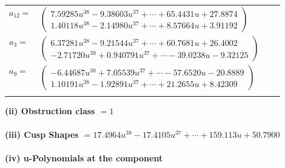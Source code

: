 \documentclass[1p]{elsarticle_modified}
\theoremstyle{definition}
\begin{document}
\begin{tabular}{m{7pt} m{180pt} m{7pt} m{180pt} }
\flushright $a_{12}=$&$\begin{pmatrix}7.59285 u^{38}-9.38603 u^{37}+\cdots+65.4431 u+27.8874\\1.40118 u^{38}-2.14980 u^{37}+\cdots+8.57664 u+3.91192\end{pmatrix}$ \\
\flushright $a_{3}=$&$\begin{pmatrix}6.37281 u^{38}-9.21544 u^{37}+\cdots+60.7681 u+26.4002\\-2.71720 u^{38}+0.940791 u^{37}+\cdots-39.0238 u-9.32125\end{pmatrix}$ \\
\flushright $a_{9}=$&$\begin{pmatrix}-6.44687 u^{38}+7.05539 u^{37}+\cdots-57.6520 u-20.8889\\1.10191 u^{38}-1.92891 u^{37}+\cdots+21.2655 u+8.42309\end{pmatrix}$\\&\end{tabular}
\flushleft \textbf{(ii) Obstruction class $= 1$}\\~\\
\flushleft \textbf{(iii) Cusp Shapes $= 17.4964 u^{38}-17.4105 u^{37}+\cdots+159.113 u+50.7900$}\\~\\
\newpage\renewcommand{\arraystretch}{1}
\flushleft \textbf{(iv) u-Polynomials at the component}\newline \\
\end{document}
